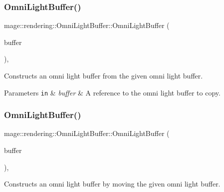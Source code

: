 \subsubsection{\texorpdfstring{Omni\+Light\+Buffer()}{OmniLightBuffer()}\hspace{0.1cm}{\footnotesize\ttfamily [2/3]}}
{\footnotesize\ttfamily mage\+::rendering\+::\+Omni\+Light\+Buffer\+::\+Omni\+Light\+Buffer (\begin{DoxyParamCaption}\item[{const \mbox{\hyperlink{structmage_1_1rendering_1_1_omni_light_buffer}{Omni\+Light\+Buffer}} \&}]{buffer }\end{DoxyParamCaption})\hspace{0.3cm}{\ttfamily [default]}, {\ttfamily [noexcept]}}

Constructs an omni light buffer from the given omni light buffer.


\begin{DoxyParams}[1]{Parameters}
\mbox{\tt in}  & {\em buffer} & A reference to the omni light buffer to copy. \\
\hline
\end{DoxyParams}
\mbox{\label{structmage_1_1rendering_1_1_omni_light_buffer_a8a1a458735f88d1dbd86590f1807c0a4}} 
\subsubsection{\texorpdfstring{Omni\+Light\+Buffer()}{OmniLightBuffer()}\hspace{0.1cm}{\footnotesize\ttfamily [3/3]}}
{\footnotesize\ttfamily mage\+::rendering\+::\+Omni\+Light\+Buffer\+::\+Omni\+Light\+Buffer (\begin{DoxyParamCaption}\item[{\mbox{\hyperlink{structmage_1_1rendering_1_1_omni_light_buffer}{Omni\+Light\+Buffer}} \&\&}]{buffer }\end{DoxyParamCaption})\hspace{0.3cm}{\ttfamily [default]}, {\ttfamily [noexcept]}}

Constructs an omni light buffer by moving the given omni light buffer.



